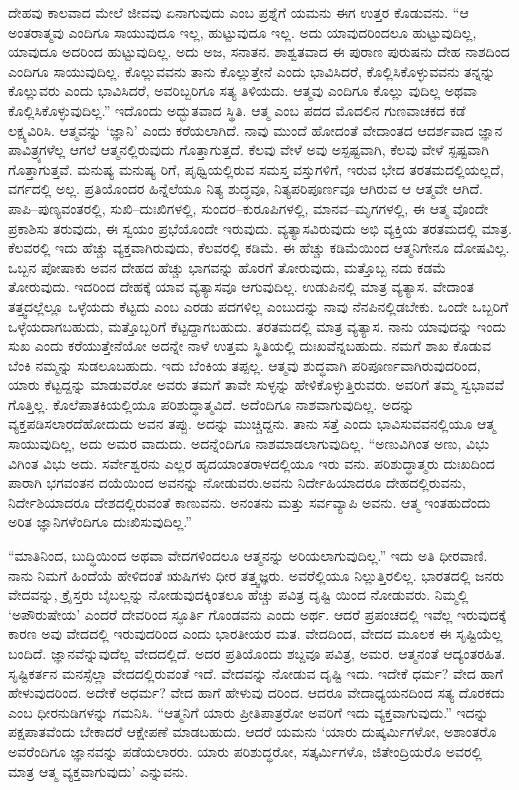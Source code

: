 ದೇಹವು ಕಾಲವಾದ ಮೇಲೆ ಜೀವವು ಏನಾಗುವುದು ಎಂಬ ಪ್ರಶ್ನೆಗೆ ಯಮನು ಈಗ ಉತ್ತರ ಕೊಡುವನು. “ಆ ಅಂತರಾತ್ಮವು ಎಂದಿಗೂ ಸಾಯುವುದೂ ಇಲ್ಲ, ಹುಟ್ಟುವುದೂ ಇಲ್ಲ. ಅದು ಯಾವುದರಿಂದಲೂ ಹುಟ್ಟುವುದಿಲ್ಲ, ಯಾವುದೂ ಅದರಿಂದ ಹುಟ್ಟುವುದಿಲ್ಲ. ಅದು ಅಜ, ಸನಾತನ. ಶಾಶ್ವತವಾದ ಈ ಪುರಾಣ ಪುರುಷನು ದೇಹ ನಾಶದಿಂದ ಎಂದಿಗೂ ಸಾಯುವುದಿಲ್ಲ. ಕೊಲ್ಲುವವನು ತಾನು ಕೊಲ್ಲುತ್ತೇನೆ ಎಂದು ಭಾವಿಸಿದರೆ, ಕೊಲ್ಲಿಸಿಕೊಳ್ಳುವವನು ತನ್ನನ್ನು ಕೊಲ್ಲುವರು ಎಂದು ಭಾವಿಸಿದರೆ, ಅವರಿಬ್ಬರಿಗೂ ಸತ್ಯ ತಿಳಿಯದು. ಆತ್ಮವು ಎಂದಿಗೂ ಕೊಲ್ಲು ವುದಿಲ್ಲ ಅಥವಾ ಕೊಲ್ಲಿಸಿಕೊಳ್ಳುವುದಿಲ್ಲ.” ಇದೊಂದು ಅದ್ಭುತವಾದ ಸ್ಥಿತಿ. ಆತ್ಮ ಎಂಬ ಪದದ ಮೊದಲಿನ ಗುಣವಾಚಕದ ಕಡೆ ಲಕ್ಷ್ಯವಿರಿಸಿ. ಆತ್ಮವನ್ನು ‘ಜ್ಞಾನಿ’ ಎಂದು ಕರೆಯಲಾಗಿದೆ. ನಾವು ಮುಂದೆ ಹೋದಂತೆ ವೇದಾಂತದ ಆದರ್ಶವಾದ ಜ್ಞಾನ ಪಾವಿತ್ರ್ಯಗಳೆಲ್ಲ ಆಗಲೆ ಆತ್ಮನಲ್ಲಿರುವುದು ಗೊತ್ತಾಗುತ್ತದೆ. ಕೆಲವು ವೇಳೆ ಅವು ಅಸ್ಪಷ್ಟವಾಗಿ, ಕೆಲವು ವೇಳೆ ಸ್ಪಷ್ಟವಾಗಿ ಗೊತ್ತಾಗುತ್ತವೆ. ಮನುಷ್ಯ ಮನುಷ್ಯ ರಿಗೆ, ಪೃಥ್ವಿಯಲ್ಲಿರುವ ಸಮಸ್ತ ವಸ್ತುಗಳಿಗೆ, ಇರುವ ಭೇದ ತರತಮದಲ್ಲಿಯಲ್ಲದೆ, ವರ್ಗದಲ್ಲಿ ಅಲ್ಲ. ಪ್ರತಿಯೊಂದರ ಹಿನ್ನೆಲೆಯೂ ನಿತ್ಯ ಶುದ್ಧವೂ, ನಿತ್ಯಪರಿಪೂರ್ಣವೂ ಆಗಿರುವ ಆ ಆತ್ಮವೇ ಆಗಿದೆ. ಪಾಪಿ–ಪುಣ್ಯವಂತರಲ್ಲಿ, ಸುಖಿ–ದುಃಖಿಗಳಲ್ಲಿ, ಸುಂದರ–ಕುರೂಪಿಗಳಲ್ಲಿ, ಮಾನವ–ಮೃಗಗಳಲ್ಲಿ, ಈ ಆತ್ಮ ವೊಂದೇ ಪ್ರಕಾಶಿಸು ತರುವುದು, ಈ ಸ್ವಯಂ ಪ್ರಭೆಯೊಂದೇ ಇರುವುದು. ವ್ಯತ್ಯಾಸವಿರುವುದು ಅಭಿ ವ್ಯಕ್ತಿಯ ತರತಮದಲ್ಲಿ ಮಾತ್ರ. ಕೆಲವರಲ್ಲಿ ಇದು ಹೆಚ್ಚು ವ್ಯಕ್ತವಾಗಿರುವುದು, ಕೆಲವರಲ್ಲಿ ಕಡಿಮೆ. ಈ ಹೆಚ್ಚು ಕಡಿಮೆಯಿಂದ ಆತ್ಮನಿಗೇನೂ ದೋಷವಿಲ್ಲ. ಒಬ್ಬನ ಪೋಷಾಕು ಅವನ ದೇಹದ ಹೆಚ್ಚು ಭಾಗವನ್ನು ಹೊರಗೆ ತೋರುವುದು, ಮತ್ತೊಬ್ಬ ನದು ಕಡಮೆ ತೋರುವುದು. ಇದರಿಂದ ದೇಹಕ್ಕೆ ಯಾವ ವ್ಯತ್ಯಾಸವೂ ಆಗುವುದಿಲ್ಲ. ಉಡುಪಿನಲ್ಲಿ ಮಾತ್ರ ವ್ಯತ್ಯಾಸ. ವೇದಾಂತ ತತ್ತ್ವದಲ್ಲೆಲ್ಲೂ ಒಳ್ಳೆಯದು ಕೆಟ್ಟದು ಎಂಬ ಎರಡು ಪದಗಳಿಲ್ಲ ಎಂಬುದನ್ನು ನಾವು ನೆನಪಿನಲ್ಲಿಡಬೇಕು. ಒಂದೇ ಒಬ್ಬರಿಗೆ ಒಳ್ಳೆಯದಾಗಬಹುದು, ಮತ್ತೊಬ್ಬರಿಗೆ ಕೆಟ್ಟದ್ದಾಗಬಹುದು. ತರತಮದಲ್ಲಿ ಮಾತ್ರ ವ್ಯತ್ಯಾಸ. ನಾನು ಯಾವುದನ್ನು ಇಂದು ಸುಖ ಎಂದು ಕರೆಯುತ್ತೇನೆಯೋ ಅದನ್ನೇ ನಾಳೆ ಉತ್ತಮ ಸ್ಥಿತಿಯಲ್ಲಿ ದುಃಖವೆನ್ನಬಹುದು. ನಮಗೆ ಶಾಖ ಕೊಡುವ ಬೆಂಕಿ ನಮ್ಮನ್ನು ಸುಡಲೂಬಹುದು. ಇದು ಬೆಂಕಿಯ ತಪ್ಪಲ್ಲ. ಆತ್ಮವು ಶುದ್ಧವಾಗಿ ಪರಿಪೂರ್ಣವಾಗಿರುವುದರಿಂದ, ಯಾರು ಕೆಟ್ಟದ್ದನ್ನು ಮಾಡುವರೋ ಅವರು ತಮಗೆ ತಾವೇ ಸುಳ್ಳನ್ನು ಹೇಳಿಕೊಳ್ಳುತ್ತಿರುವರು. ಅವರಿಗೆ ತಮ್ಮ ಸ್ವಭಾವವೆ ಗೊತ್ತಿಲ್ಲ. ಕೊಲೆಪಾತಕಿಯಲ್ಲಿಯೂ ಪರಿಶುದ್ಧಾತ್ಮವಿದೆ. ಅದೆಂದಿಗೂ ನಾಶವಾಗುವುದಿಲ್ಲ. ಅದನ್ನು ವ್ಯಕ್ತಪಡಿಸಲಾರದೆಹೋದುದು ಅವನ ತಪ್ಪು. ಅದನ್ನು ಮುಚ್ಚಿದ್ದನು. ತಾನು ಸತ್ತೆ ಎಂದು ಭಾವಿಸುವವನಲ್ಲಿಯೂ ಆತ್ಮ ಸಾಯುವುದಿಲ್ಲ, ಅದು ಅಮರ ವಾದುದು. ಅದನ್ನೆಂದಿಗೂ ನಾಶಮಾಡಲಾಗುವುದಿಲ್ಲ. “ಅಣುವಿಗಿಂತ ಅಣು, ವಿಭು ವಿಗಿಂತ ವಿಭು ಅದು. ಸರ್ವೇಶ್ವರನು ಎಲ್ಲರ ಹೃದಯಾಂತರಾಳದಲ್ಲಿಯೂ ಇರು ವನು. ಪರಿಶುದ್ಧಾತ್ಮರು ದುಃಖದಿಂದ ಪಾರಾಗಿ ಭಗವಂತನ ದಯೆಯಿಂದ ಅವನನ್ನು ನೋಡುವರು.ಅವನು ನಿರ್ದೇಹಿಯಾದರೂ ದೇಹದಲ್ಲಿರುವನು, ನಿರ್ದೇಶಿಯಾದರೂ ದೇಶದಲ್ಲಿರುವಂತೆ ಕಾಣುವನು. ಅನಂತನು ಮತ್ತು ಸರ್ವವ್ಯಾಪಿ ಅವನು. ಆತ್ಮ ಇಂತಹುದೆಂದು ಅರಿತ ಜ್ಞಾನಿಗಳೆಂದಿಗೂ ದುಃಖಿಸುವುದಿಲ್ಲ.”

“ಮಾತಿನಿಂದ, ಬುದ್ಧಿಯಿಂದ ಅಥವಾ ವೇದಗಳಿಂದಲೂ ಆತ್ಮನನ್ನು ಅರಿಯಲಾಗುವುದಿಲ್ಲ.” ಇದು ಅತಿ ಧೀರವಾಣಿ. ನಾನು ನಿಮಗೆ ಹಿಂದೆಯೆ ಹೇಳಿದಂತೆ ಋಷಿಗಳು ಧೀರ ತತ್ತ್ವಜ್ಞರು. ಅವರೆಲ್ಲಿಯೂ ನಿಲ್ಲುತ್ತಿರಲಿಲ್ಲ. ಭಾರತದಲ್ಲಿ ಜನರು ವೇದವನ್ನು, ಕ್ರೈಸ್ತರು ಬೈಬಲ್ಲನ್ನು ನೋಡುವುದಕ್ಕಿಂತಲೂ ಹೆಚ್ಚು ಪವಿತ್ರ ದೃಷ್ಟಿ ಯಿಂದ ನೋಡುವರು. ನಿಮ್ಮಲ್ಲಿ ‘ಅಪೌರುಷೇಯ’ ಎಂದರೆ ದೇವರಿಂದ ಸ್ಫೂರ್ತಿ ಗೊಂಡವನು ಎಂದು ಅರ್ಥ. ಆದರೆ ಪ್ರಪಂಚದಲ್ಲಿ ಇವೆಲ್ಲ ಇರುವುದಕ್ಕೆ ಕಾರಣ ಅವು ವೇದದಲ್ಲಿ ಇರುವುದರಿಂದ ಎಂದು ಭಾರತೀಯರ ಮತ. ವೇದದಿಂದ, ವೇದದ ಮೂಲಕ ಈ ಸೃಷ್ಟಿಯೆಲ್ಲ ಬಂದಿದೆ. ಜ್ಞಾನವೆನ್ನುವುದೆಲ್ಲ ವೇದದಲ್ಲಿದೆ. ಅದರ ಪ್ರತಿಯೊಂದು ಶಬ್ದವೂ ಪವಿತ್ರ, ಅಮರ. ಆತ್ಮನಂತೆ ಆದ್ಯಂತರಹಿತ. ಸೃಷ್ಟಿಕರ್ತನ ಮನಸ್ಸೆಲ್ಲಾ ವೇದದಲ್ಲಿರುವಂತೆ ಇದೆ. ವೇದವನ್ನು ನೋಡುವ ದೃಷ್ಟಿ ಇದು. ಇದೇಕೆ ಧರ್ಮ? ವೇದ ಹಾಗೆ ಹೇಳುವುದರಿಂದ. ಅದೇಕೆ ಅಧರ್ಮ? ವೇದ ಹಾಗೆ ಹೇಳುವು ದರಿಂದ. ಆದರೂ ವೇದಾಧ್ಯಯನದಿಂದ ಸತ್ಯ ದೊರಕದು ಎಂಬ ಧೀರನುಡಿಗಳನ್ನು ಗಮನಿಸಿ. “ಆತ್ಮನಿಗೆ ಯಾರು ಪ್ರೀತಿಪಾತ್ರರೋ ಅವರಿಗೆ ಇದು ವ್ಯಕ್ತವಾಗುವುದು.” ಇದನ್ನು ಪಕ್ಷಪಾತವೆಂದು ಬೇಕಾದರೆ ಆಕ್ಷೇಪಣೆ ಮಾಡಬಹುದು. ಆದರೆ ಯಮನು ‘ಯಾರು ದುಷ್ಕರ್ಮಿಗಳೋ, ಅಶಾಂತರೊ ಅವರೆಂದಿಗೂ ಜ್ಞಾನವನ್ನು ಪಡೆಯಲಾರರು. ಯಾರು ಪರಿಶುದ್ಧರೋ, ಸತ್ಕರ್ಮಿಗಳೊ, ಜಿತೇಂದ್ರಿಯರೊ ಅವರಲ್ಲಿ ಮಾತ್ರ ಆತ್ಮ ವ್ಯಕ್ತವಾಗುವುದು’ ಎನ್ನುವನು.


